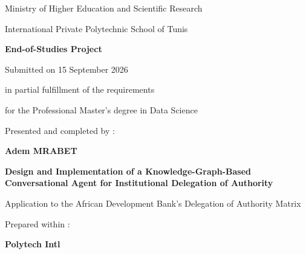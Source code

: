 \begin{titlepage}
\centering

{\small Ministry of Higher Education and Scientific Research \par}
{\small International Private Polytechnic School of Tunis \par}

\vspace{0.4cm}
\noindent
\begin{minipage}[c]{0.45\textwidth}
  \raggedright
\end{minipage}
\hfill
\begin{minipage}[c]{0.45\textwidth}
  \raggedleft
\end{minipage}

\vspace{0.6cm}
{\sffamily\bfseries\LARGE End-of-Studies Project \par}
\vspace{0.35cm}
{\small Submitted on 15 September 2026 \par}
{\small in partial fulfillment of the requirements \par}
{\small for the Professional Master's degree in Data Science \par}

\vspace{0.5cm}
{\small Presented and completed by : \par}
\vspace{0.15cm}
{\sffamily\bfseries\large Adem MRABET \par}

\vspace{0.6cm}
{\sffamily\bfseries\LARGE\color{thesisgreendark}
Design and Implementation of a Knowledge-Graph-Based Conversational Agent for Institutional Delegation of Authority \par}
\vspace{0.25cm}
{\sffamily\normalsize\color{thesisgreen} Application to the African Development Bank's Delegation of Authority Matrix \par}

\vspace{0.55cm}
{\small Prepared within : \par}
\vspace{0.1cm}
{\sffamily\bfseries\large Polytech Intl \par}


\end{titlepage}
